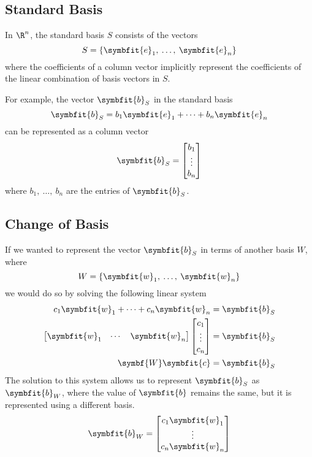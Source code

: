 \documentclass{article}
\begin{document}
\subsection{Standard Basis}
In \(\R^n\), the standard basis \(S\) consists of the vectors
\begin{equation*}
    S = \left\{ \symbfit{e}_1,\: \dots,\: \symbfit{e}_n \right\}
\end{equation*}
where the coefficients of a column vector implicitly represent the coefficients
of the linear \linebreak combination of basis vectors in \(S\).

For example, the vector \(\symbfit{b}_S\) in the standard basis
\begin{equation*}
    \symbfit{b}_S = b_1 \symbfit{e}_1 + \cdots + b_n \symbfit{e}_n
\end{equation*}
can be represented as a column vector
\begin{equation*}
    \symbfit{b}_S = \begin{bmatrix}
        b_1    \\
        \vdots \\
        b_n
    \end{bmatrix}
\end{equation*}
where \(b_1,\: \dots,\: b_n\) are the entries of \(\symbfit{b}_S\).
\subsection{Change of Basis}
If we wanted to represent the vector \(\symbfit{b}_S\) in terms of another basis
\(W\), where
\begin{equation*}
    W = \left\{ \symbfit{w}_1,\: \dots,\: \symbfit{w}_n \right\}
\end{equation*}
we would do so by solving the following linear system
\begin{align*}
    c_1 \symbfit{w}_1 + \cdots + c_n \symbfit{w}_n & = \symbfit{b}_S \\
    \begin{bmatrix}
        \symbfit{w}_1 & \cdots & \symbfit{w}_n
    \end{bmatrix} \begin{bmatrix}
                      c_1    \\
                      \vdots \\
                      c_n
                  \end{bmatrix}        & = \symbfit{b}_S             \\
    \symbf{W} \symbfit{c}                          & = \symbfit{b}_S
\end{align*}
The solution to this system allows us to represent \(\symbfit{b}_S\) as
\(\symbfit{b}_W\), where the value of \(\symbfit{b}\) remains the same, but
it is represented using a different basis.
\begin{equation*}
    \symbfit{b}_W = \begin{bmatrix}
        c_1 \symbfit{w}_1 \\
        \vdots            \\
        c_n \symbfit{w}_n
    \end{bmatrix}
\end{equation*}
\end{document}
